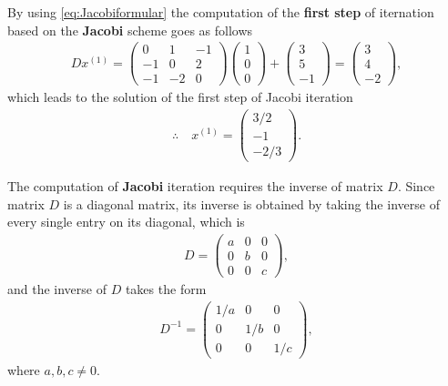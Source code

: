 \documentclass[12pt]{article}
\begin{document}
By using \eqref{eq:Jacobiformular}
the computation of the \textbf{first step} of iternation based on 
the \textbf{Jacobi} scheme goes as follows
\begin{align}
	Dx^{(1)}
	= \begin{pmatrix}0&1&-1\\-1&0&2\\-1&-2&0\end{pmatrix}
	\begin{pmatrix}1\\0\\0\end{pmatrix}+\begin{pmatrix}3\\5\\-1\end{pmatrix}
	=\begin{pmatrix}3\\4\\-2\end{pmatrix},
\end{align}
which leads to the solution of the first step of Jacobi iteration
\begin{align}
	\therefore\quad\boxed{
		x^{(1)}=\begin{pmatrix}3/2\\-1\\-2/3\end{pmatrix}.
	}
\end{align}
\newpage
\begin{remark}
	The computation of \textbf{Jacobi} iteration requires the inverse of matrix $D$.
	Since matrix $D$ is a diagonal matrix, its inverse is obtained by 
	taking the inverse of every single entry on its diagonal, which is
	\begin{align}
		D = 
		\begin{pmatrix}
			a & 0 & 0  \\
			0 & b & 0  \\
			0 & 0 & c 
		\end{pmatrix},
	\end{align}
	and the inverse of $D$ takes the form
	\begin{align}
		D^{-1} = 
		\begin{pmatrix}
			1/a & 0   & 0    \\
			0   & 1/b & 0    \\
			0   & 0   & 1/c 
		\end{pmatrix},
	\end{align}
	where $a,b,c \neq 0.$
\end{remark}
\end{document}
